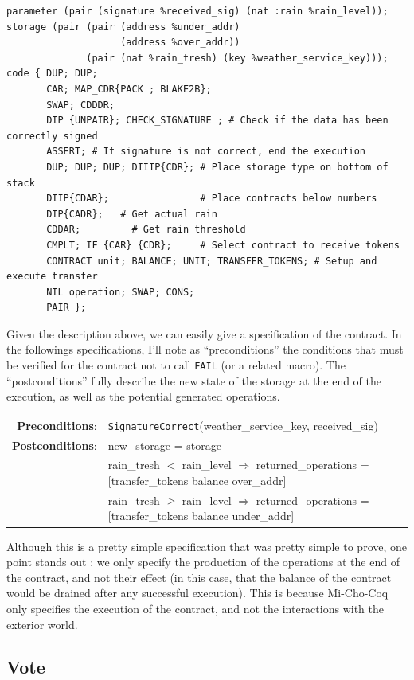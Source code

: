 \documentclass{report}
\begin{document}
\begin{lstlisting}[language=michelson]
parameter (pair (signature %received_sig) (nat :rain %rain_level));
storage (pair (pair (address %under_addr)
                    (address %over_addr))
              (pair (nat %rain_tresh) (key %weather_service_key)));
code { DUP; DUP;
       CAR; MAP_CDR{PACK ; BLAKE2B};
       SWAP; CDDDR;
       DIP {UNPAIR}; CHECK_SIGNATURE ; # Check if the data has been correctly signed
       ASSERT; # If signature is not correct, end the execution
       DUP; DUP; DUP; DIIIP{CDR}; # Place storage type on bottom of stack
       DIIP{CDAR};                # Place contracts below numbers
       DIP{CADR};   # Get actual rain
       CDDAR;         # Get rain threshold
       CMPLT; IF {CAR} {CDR};     # Select contract to receive tokens
       CONTRACT unit; BALANCE; UNIT; TRANSFER_TOKENS; # Setup and execute transfer
       NIL operation; SWAP; CONS;
       PAIR };
\end{lstlisting}
Given the description above, we can easily give a specification of the contract. In the followings specifications, I'll note as ``preconditions'' the conditions that must be verified for the contract not to call \lstinline{FAIL} (or a related macro). The ``postconditions'' fully describe the new state of the storage at the end of the execution, as well as the potential generated operations.

{\small
\begin{longtable}{rl}
  \textbf{Preconditions}: & \texttt{SignatureCorrect}(weather\_service\_key, received\_sig)\\
  \textbf{Postconditions}: & new\_storage = storage\\
  & rain\_tresh $<$ rain\_level $\Rightarrow$ returned\_operations = [transfer\_tokens balance over\_addr]\\
  & rain\_tresh $\ge$ rain\_level $\Rightarrow$ returned\_operations = [transfer\_tokens balance under\_addr]\\
\end{longtable}}

Although this is a pretty simple specification that was pretty simple to prove, one point stands out : we only specify the production of the operations at the end of the contract, and not their effect (in this case, that the balance of the contract would be drained after any successful execution). This is because Mi-Cho-Coq only specifies the execution of the contract, and not the interactions with the exterior world.

\subsection{Vote}
\end{document}
